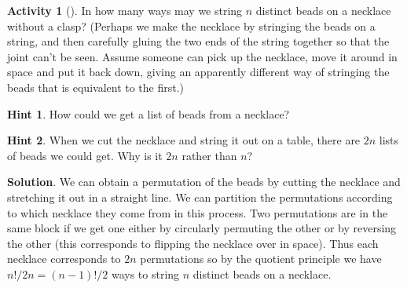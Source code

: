 \documentclass[10pt,]{book}
\theoremstyle{plain}
\theoremstyle{definition}
\theoremstyle{definition}
\theoremstyle{definition}
\newtheorem{activity}[project]{Activity}
\theoremstyle{definition}
\numberwithin{equation}{chapter}
\begin{document}
\begin{activity}[]\label{necklace}
\hypertarget{p-672}{}%
In how many ways may we string \(n\) distinct beads on a necklace without a clasp? (Perhaps we make the necklace by stringing the beads on a string, and then carefully gluing the two ends of the string together so that the joint can't be seen. Assume someone can pick up the necklace, move it around in space and put it back down, giving an apparently different way of stringing the beads that is equivalent to the first.)%
\par\smallskip%
\noindent\textbf{Hint 1}.\hypertarget{hint-42}{}\quad%
\hypertarget{p-673}{}%
How could we get a list of beads from a necklace?%
\par\smallskip%
\noindent\textbf{Hint 2}.\hypertarget{hint-43}{}\quad%
\hypertarget{p-674}{}%
When we cut the necklace and string it out on a table, there are \(2n\) lists of beads we could get. Why is it \(2n\) rather than \(n\)?%
\par\smallskip%
\noindent\textbf{Solution}.\hypertarget{solution-60}{}\quad%
\hypertarget{p-675}{}%
We can obtain a permutation of the beads by cutting the necklace and stretching it out in a straight line. We can partition the permutations according to which necklace they come from in this process. Two permutations are in the same block if we get one either by circularly permuting the other or by reversing the other (this corresponds to flipping the necklace over in space). Thus each necklace corresponds to \(2n\) permutations so by the quotient principle we have \(n!/2n=(n-1)!/2\) ways to string \(n\) distinct beads on a necklace.%
\end{activity}
\end{document}
